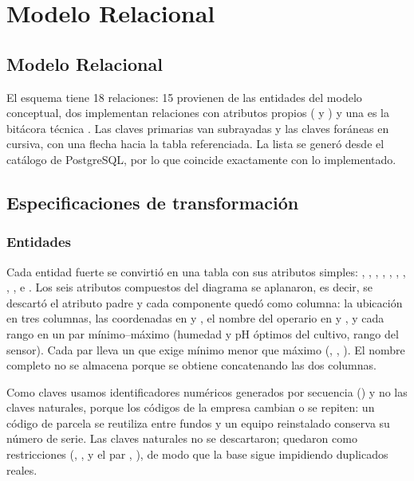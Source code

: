 \section{Modelo Relacional}

\subsection{Modelo Relacional}

El esquema tiene 18 relaciones: 15 provienen de las entidades del modelo conceptual, dos implementan relaciones con atributos propios ( y ) y una es la bitácora técnica . Las claves primarias van subrayadas y las claves foráneas en cursiva, con una flecha hacia la tabla referenciada. La lista se generó desde el catálogo de PostgreSQL, por lo que coincide exactamente con lo implementado.


\subsection{Especificaciones de transformación}

\subsubsection{Entidades}\label{sec:trans-entidades}

Cada entidad fuerte se convirtió en una tabla con sus atributos simples: , , , , , , , , ,  e . Los seis atributos compuestos del diagrama se aplanaron, es decir, se descartó el atributo padre y cada componente quedó como columna: la ubicación en tres columnas, las coordenadas en  y , el nombre del operario en  y , y cada rango en un par mínimo--máximo (humedad y pH óptimos del cultivo, rango del sensor). Cada par lleva un  que exige mínimo menor que máximo (, , ). El nombre completo no se almacena porque se obtiene concatenando las dos columnas.

Como claves usamos identificadores numéricos generados por secuencia () y no las claves naturales, porque los códigos de la empresa cambian o se repiten: un código de parcela se reutiliza entre fundos y un equipo reinstalado conserva su número de serie. Las claves naturales no se descartaron; quedaron como restricciones  (, ,  y el par , ), de modo que la base sigue impidiendo duplicados reales.

